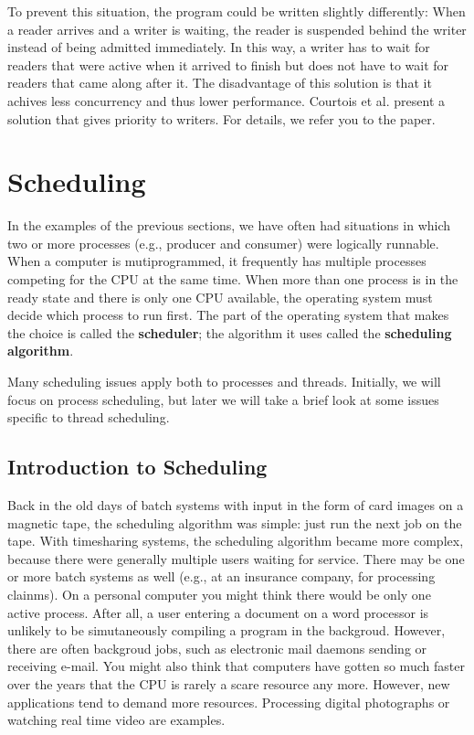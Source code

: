 \documentclass{book}
\newcommand {\kw}  [1] {\textbf{#1}}
\begin{document}
To prevent this situation, the program could be written slightly differently:
When a reader arrives and a writer is waiting, the reader is suspended behind the writer instead of being admitted immediately.
In this way, a writer has to wait for readers that were active when it arrived to finish 
but does not have to wait for readers that came along after it. 
The disadvantage of this solution is that it achives less concurrency and thus lower performance.
Courtois et al. present a solution that gives priority to writers.
For details, we refer you to the paper.

\section{Scheduling}
In the examples of the previous sections, we have often had situations in which 
two or more processes (e.g., producer and consumer) were logically runnable.
When a computer is mutiprogrammed, it frequently has multiple processes competing for the CPU at the same time.
When more than one process is in the ready state and there is only one CPU available,
the operating system must decide which process to run first.
The part of the operating system that makes the choice is called the \kw{scheduler};
the algorithm it uses called the \kw{scheduling algorithm}.

Many scheduling issues apply both to processes and threads.
Initially, we will focus on process scheduling, but later we will take a brief look at some issues specific to thread scheduling.

\subsection{Introduction to Scheduling}
Back in the old days of batch systems with input in the form of card images on a magnetic tape,
the scheduling algorithm was simple: just run the next job on the tape.
With timesharing systems, the scheduling algorithm became more complex, because there were generally multiple users waiting for service.
There may be one or more batch systems as well (e.g., at an insurance company, for processing clainms).
On a personal computer you might think there would be only one active process.
After all, a user entering a document on a word processor is unlikely to be simutaneously compiling a program in the backgroud.
However, there are often backgroud jobs, such as electronic mail daemons sending or receiving e-mail.
You might also think that computers have gotten so much faster over the years that the CPU is rarely a scare resource any more.
However, new applications tend to demand more resources.
Processing digital photographs or watching real time video are examples.
\end{document}
